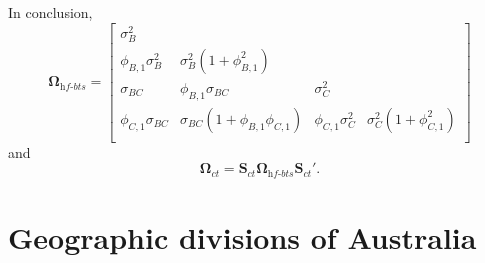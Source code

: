 \documentclass[a4paper,11pt]{article}
\newcommand{\Svet}{\bm{S}}
\newcommand{\Omegavet}{\bm{\Omega}}
\theoremstyle{definition}
\begin{document}
In conclusion,
$$
	\Omegavet_{\textit{hf-bts}} = \begin{bmatrix}
		\sigma^2_B            &                                                 &                      &                                       \\
		\phi_{B,1}\sigma_B^2  & \sigma_B^2\left(1+\phi_{B,1}^2\right)           &                      &                                       \\
		\sigma_{BC}           & \phi_{B,1}\sigma_{BC}                           & \sigma_C^2           &                                       \\
		\phi_{C,1}\sigma_{BC} & \sigma_{BC}\left(1+\phi_{B,1}\phi_{C,1} \right) & \phi_{C,1}\sigma_C^2 & \sigma_C^2\left(1+\phi_{C,1}^2\right) \\
	\end{bmatrix}
$$
and
$$
	\Omegavet_{ct} = \Svet_{ct}\Omegavet_{\textit{hf-bts}}\Svet_{ct}'.
$$

\newpage

\section{Geographic divisions of Australia}
\label{app:australia}
\end{document}
